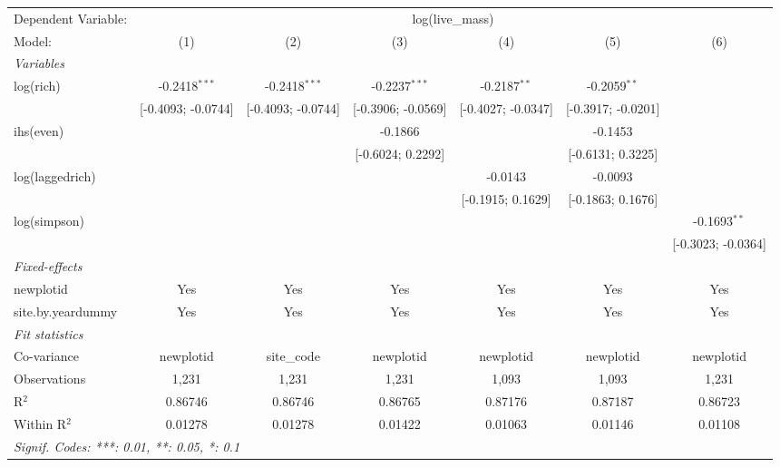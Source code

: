 \begin{tabular}{lcccccc}
\tabularnewline\midrule\midrule
Dependent Variable:&\multicolumn{6}{c}{log(live\_mass)}\\
Model:&(1) & (2) & (3) & (4) & (5) & (6)\\
\midrule \emph{Variables}&   &   &   &   &   &  \\
log(rich) & -0.2418$^{***}$ & -0.2418$^{***}$ & -0.2237$^{***}$ & -0.2187$^{**}$ & -0.2059$^{**}$ &   \\
  &[-0.4093; -0.0744] & [-0.4093; -0.0744] & [-0.3906; -0.0569] & [-0.4027; -0.0347] & [-0.3917; -0.0201] &   \\
ihs(even) &    &    & -0.1866 &    & -0.1453 &   \\
  &   &    & [-0.6024; 0.2292] &    & [-0.6131; 0.3225] &   \\
log(laggedrich) &    &    &    & -0.0143 & -0.0093 &   \\
  &   &    &    & [-0.1915; 0.1629] & [-0.1863; 0.1676] &   \\
log(simpson) &    &    &    &    &    & -0.1693$^{**}$\\
  &   &    &    &    &    & [-0.3023; -0.0364]\\
\midrule \emph{Fixed-effects}&   &   &   &   &   &  \\
newplotid & Yes & Yes & Yes & Yes & Yes & Yes\\
site.by.yeardummy & Yes & Yes & Yes & Yes & Yes & Yes\\
\midrule \emph{Fit statistics}&  & & & & & \\
Co-variance& newplotid&site\_code&newplotid&newplotid&newplotid&newplotid\\
Observations & 1,231&1,231&1,231&1,093&1,093&1,231\\
R$^2$ & 0.86746&0.86746&0.86765&0.87176&0.87187&0.86723\\
Within R$^2$ & 0.01278&0.01278&0.01422&0.01063&0.01146&0.01108\\
\midrule\midrule\multicolumn{7}{l}{\emph{Signif. Codes: ***: 0.01, **: 0.05, *: 0.1}}\\
\end{tabular}


